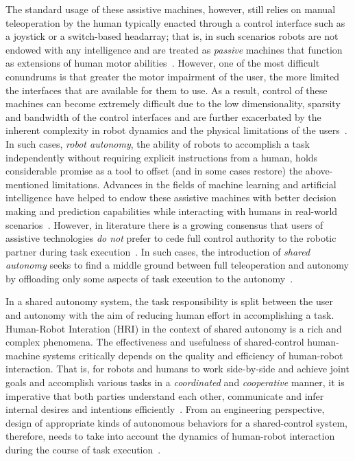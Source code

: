 \documentclass[12pt]{article}
\begin{document}
%
%
The standard usage of these assistive machines, however, still relies on manual teleoperation by the human typically enacted through a control interface such as a joystick or a switch-based headarray; that is, in such scenarios robots are not endowed with any intelligence and are treated as \textit{passive} machines that function as extensions of human motor abilities~\cite{simpson2008tooth}. However, one of the most difficult conundrums is that greater the motor impairment of the user, the more limited the interfaces that are available for them to use. As a result, control of these machines can become extremely difficult due to the low dimensionality, sparsity and bandwidth of the control interfaces and are further exacerbated by the inherent complexity in robot dynamics and the physical limitations of the users~\cite{pilarski2012dynamic}.
In such cases, \textit{robot autonomy}, the ability of robots to accomplish a task independently without requiring explicit instructions from a human, holds considerable promise as a tool to offset (and in some cases restore) the above-mentioned limitations. Advances in the fields of machine learning and artificial intelligence have helped to endow these assistive machines with better decision making and prediction capabilities while interacting with humans in real-world scenarios~\cite{huang2015using}.
However, in literature there is a growing consensus that users of assistive technologies \textit{do not} prefer to cede full control authority to the robotic partner during task execution~\cite{gopinath2017human}. In such cases, the introduction of \textit{shared autonomy} seeks to find a middle ground between full teleoperation and autonomy by offloading only some aspects of task execution to the autonomy~\cite{wasson2003user, demeester2008user}. 

In a shared autonomy system, the task responsibility is split between the user and autonomy with the aim of reducing human effort in accomplishing a task. Human-Robot Interation (HRI) in the context of shared autonomy is a rich and complex phenomena. The effectiveness and usefulness of shared-control human-machine systems critically depends on the quality and efficiency of human-robot interaction. That is, for robots and humans to work side-by-side and achieve joint goals and accomplish various tasks in a \textit{coordinated} and \textit{cooperative} manner, it is imperative that both parties understand each other, communicate and infer internal desires and intentions efficiently~\cite{hoc2001towards}. From an engineering perspective, design of appropriate kinds of autonomous behaviors for a shared-control system, therefore, needs to take into account the dynamics of human-robot interaction during the course of task execution~\cite{hoffman2007cost}. 
\end{document}
